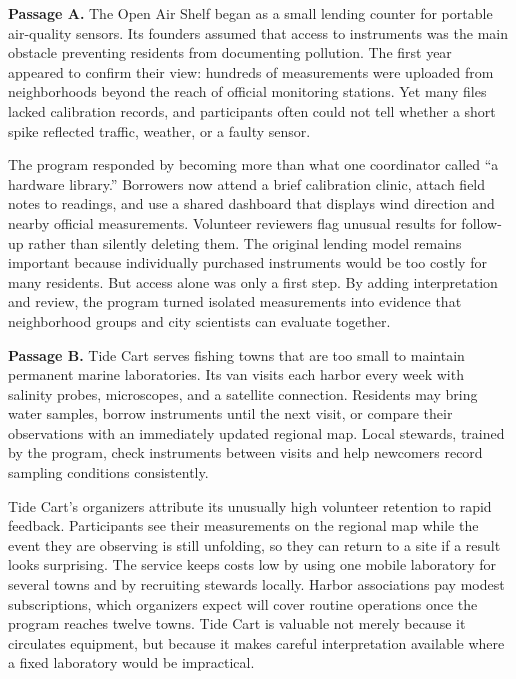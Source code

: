 \textbf{Passage A.}
The Open Air Shelf began as a small lending counter for portable air-quality sensors.
Its founders assumed that access to instruments was the main obstacle preventing residents
from documenting pollution. The first year appeared to confirm their view: hundreds of
measurements were uploaded from neighborhoods beyond the reach of official monitoring
stations. Yet many files lacked calibration records, and participants often could not tell
whether a short spike reflected traffic, weather, or a faulty sensor.

The program responded by becoming more than what one coordinator called ``a hardware
library.'' Borrowers now attend a brief calibration clinic, attach field notes to readings,
and use a shared dashboard that displays wind direction and nearby official measurements.
Volunteer reviewers flag unusual results for follow-up rather than silently deleting them.
The original lending model remains important because individually purchased instruments
would be too costly for many residents. But access alone was only a first step. By adding
interpretation and review, the program turned isolated measurements into evidence that
neighborhood groups and city scientists can evaluate together.

\textbf{Passage B.}
Tide Cart serves fishing towns that are too small to maintain permanent marine laboratories.
Its van visits each harbor every week with salinity probes, microscopes, and a satellite
connection. Residents may bring water samples, borrow instruments until the next visit,
or compare their observations with an immediately updated regional map. Local stewards,
trained by the program, check instruments between visits and help newcomers record sampling
conditions consistently.

Tide Cart's organizers attribute its unusually high volunteer retention to rapid feedback.
Participants see their measurements on the regional map while the event they are observing
is still unfolding, so they can return to a site if a result looks surprising. The service
keeps costs low by using one mobile laboratory for several towns and by recruiting stewards
locally. Harbor associations pay modest subscriptions, which organizers expect will cover
routine operations once the program reaches twelve towns. Tide Cart is valuable not merely
because it circulates equipment, but because it makes careful interpretation available where
a fixed laboratory would be impractical.

